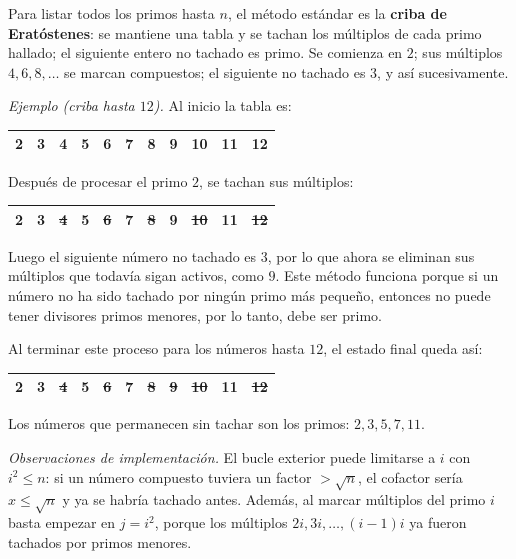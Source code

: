 Para listar todos los primos hasta $n$, el método estándar es la \textbf{criba de Eratóstenes}: se mantiene una tabla y se tachan los múltiplos de cada primo hallado; el siguiente entero no tachado es primo. Se comienza en $2$; sus múltiplos $4,6,8,\ldots$ se marcan compuestos; el siguiente no tachado es $3$, y así sucesivamente.

\textit{Ejemplo (criba hasta $12$).} Al inicio la tabla es:

\newcommand{\tach}[1]{\textcolor{red!70!black}{\st{\textbf{#1}}}}

\begin{center}
\small
\begin{tabular}{|c|c|c|c|c|c|c|c|c|c|c|}
\hline
2 & 3 & 4 & 5 & 6 & 7 & 8 & 9 & 10 & 11 & 12 \\
\hline
\end{tabular}
\end{center}

Después de procesar el primo $2$, se tachan sus múltiplos:

\begin{center}
\small
\begin{tabular}{|c|c|c|c|c|c|c|c|c|c|c|}
\hline
2 & 3 & \tach{4} & 5 & \tach{6} & 7 & \tach{8} & 9 & \tach{10} & 11 & \tach{12} \\
\hline
\end{tabular}
\end{center}

Luego el siguiente número no tachado es $3$, por lo que ahora se eliminan sus múltiplos que todavía sigan activos, como $9$. Este método funciona porque si un número no ha sido tachado por ningún primo más pequeño, entonces no puede tener divisores primos menores, por lo tanto, debe ser primo.

Al terminar este proceso para los números hasta $12$, el estado final queda así:

\begin{center}
\small
\begin{tabular}{|c|c|c|c|c|c|c|c|c|c|c|}
\hline
2 & 3 & \tach{4} & 5 & \tach{6} & 7 & \tach{8} & \tach{9} & \tach{10} & 11 & \tach{12} \\
\hline
\end{tabular}
\end{center}

Los números que permanecen sin tachar son los primos: $2,3,5,7,11$.

\textit{Observaciones de implementación.} El bucle exterior puede limitarse a $i$ con $i^2 \le n$: si un número compuesto tuviera un factor $> \sqrt{n}$, el cofactor sería $x \le \sqrt{n}$ y ya se habría tachado antes. Además, al marcar múltiplos del primo $i$ basta empezar en $j = i^2$, porque los múltiplos $2i, 3i, \ldots, (i-1)i$ ya fueron tachados por primos menores.


